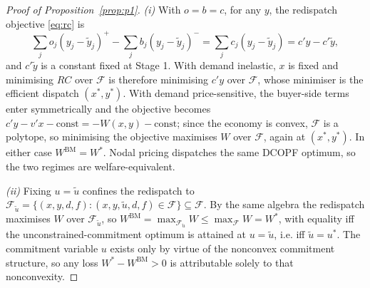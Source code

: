 \documentclass[review,3p,times]{elsarticle}
\theoremstyle{plain}
\theoremstyle{definition}
\begin{document}
\begin{proof}[Proof of Proposition~\ref{prop:p1}]
\emph{(i)} With $o=b=c$, for any $y$, the redispatch objective \eqref{eq:rc} is
\[
\sum_j o_j(y_j-\tilde y_j)^{+}-\sum_j b_j(y_j-\tilde y_j)^{-}
=\sum_j c_j(y_j-\tilde y_j)=c'y-c'\tilde y,
\]
and $c'\tilde y$ is a constant fixed at Stage 1. With demand inelastic, $x$ is
fixed and minimising $RC$ over $\mathcal F$ is therefore minimising $c'y$ over
$\mathcal F$, whose minimiser is the efficient dispatch $(x^\ast,y^\ast)$. With
demand price-sensitive, the buyer-side terms enter symmetrically and the objective
becomes $c'y-v'x-\text{const}=-W(x,y)-\text{const}$; since the economy is convex,
$\mathcal F$ is a polytope, so minimising the objective maximises $W$ over
$\mathcal F$, again at $(x^\ast,y^\ast)$. In either case $W^{\mathrm{BM}}=W^\ast$.
Nodal pricing dispatches the same DCOPF optimum, so the two regimes are
welfare-equivalent.

\emph{(ii)} Fixing $u=\tilde u$ confines the redispatch to
$\mathcal F_{\tilde u}=\{(x,y,d,f):(x,y,\tilde u,d,f)\in\mathcal F\}
\subseteq\mathcal F$. By the same algebra the redispatch maximises $W$ over
$\mathcal F_{\tilde u}$, so
$W^{\mathrm{BM}}=\max_{\mathcal F_{\tilde u}}W\le\max_{\mathcal F}W=W^\ast$, with
equality iff the unconstrained-commitment optimum is attained at $u=\tilde u$,
i.e. iff $\tilde u=u^\ast$. The commitment variable $u$ exists only
by virtue of the nonconvex commitment structure, so any loss
$W^\ast-W^{\mathrm{BM}}>0$ is attributable solely to that nonconvexity.
\end{proof}
\end{document}
